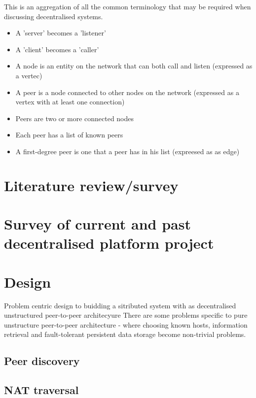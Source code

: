 \documentclass[a4paper]{article}
\begin{document}
This is an aggregation of all the common terminology that may be required when discussing decentralised systems.
\begin{itemize}
    \item A 'server' becomes a 'listener'
    \item A 'client' becomes a 'caller'
    \item A node is an entity on the network that can both call and listen (expressed as a vertec)
    \item A peer is a node connected to other nodes on the network (expressed as a vertex with at least one connection)
    \item Peers are two or more connected nodes
    \item Each peer has a list of known peers
    \item A first-degree peer is one that a peer has in his list (expreesed as as edge)
\end{itemize}

\section{Literature review/survey}
\section{Survey of current and past decentralised platform project}

\section{Design}
Problem centric design to buidding a sitributed system with as decentralised unstructured peer-to-peer architecyure
There are some problems specific to pure unstructure peer-to-peer architecture - where choosing known hosts, information retrieval and fault-tolerant persistent data storage become non-trivial problems.
\subsection{Peer discovery}
\subsection{NAT traversal}
\end{document}
